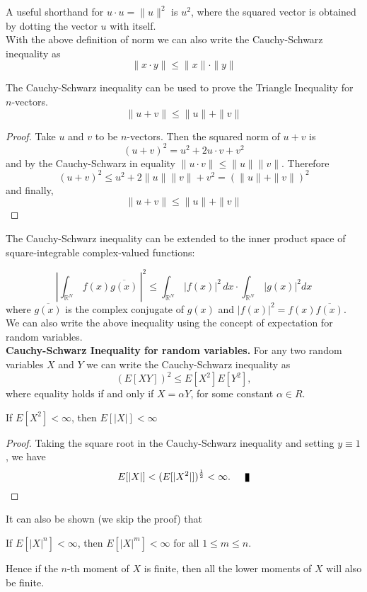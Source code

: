 A useful shorthand for $u \cdot u = \| u \|^2$ is $u^2$, where the squared vector is obtained by dotting the vector $u$ with itself. \\

With the above definition of norm we can also write the Cauchy-Schwarz inequality as
$$ \| x \cdot y \| \le \|x \|  \cdot \| y \|$$

The Cauchy-Schwarz inequality can be used to prove the Triangle Inequality for $n$-vectors. 
$$\|u + v \| \le \| u \| + \| v \|$$
\begin{proof}
Take $u$ and $v$ to be $n$-vectors. Then the squared norm of $u+v$ is 
$$(u+v)^2 = u^2 + 2u\cdot v + v^2$$ and by the Cauchy-Schwarz in equality $\|u\cdot v\| \le  \|u\| \|v\| $. Therefore 
$$(u+v)^2 \le u^2 + 2\|u\| \|v\| + v^2 = (\|u\| + \|v\|)^2$$ and finally, 
$$\| u + v \| \le \| u \| + \|v\|$$
\end{proof}
 
The Cauchy-Schwarz inequality can be extended to the inner product space of square-integrable complex-valued functions:

$$ \left| \int_{\mathbb{R}^N}\, f(x) \overline{g(x)}\, \right|^2 \le \int_{\mathbb{R}^N}\, |f(x)|^2\, dx \cdot \int_{\mathbb{R}^N}\, |g(x)|^2 dx$$ where $\overline{g(x)}$ is the complex conjugate of $g(x)$ and $|f(x)|^2 = f(x)\overline{f(x)}$.\\

We can also write the above inequality using the concept of expectation for random variables. \\

{\bf Cauchy-Schwarz Inequality for random variables.} For any two random variables $X$ and $Y$ we can write the Cauchy-Schwarz inequality as 
$$(E[XY])^2 \le E[X^2]E[Y^2],$$ where equality holds if and only if $X = \alpha Y$, for some constant $\alpha \in R$.

\begin{theorem}
If $E[X^2] < \infty$, then $E[|X|] < \infty$ 
\end{theorem}
\begin{proof}
Taking the square root in the Cauchy-Schwarz inequality and setting $y\equiv1$, we have
$$E[|X|] < (E[|X^2|])^{1\over2} < \infty.\qed$$
\end{proof}

It can also be shown (we skip the proof) that 
\begin{theorem}
If $E[|X|^n] < \infty$, then $E[|X|^m] < \infty$ for all $1\le m \le n$.
\end{theorem}
Hence if the $n$-th moment of $X$ is finite, then all the lower moments of $X$ will also be finite. 


